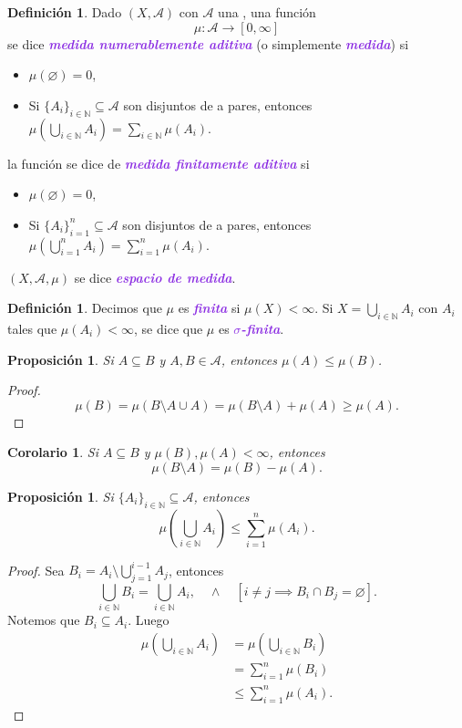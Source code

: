 \documentclass{article}
\newtheorem{corollary}[theorem]{Corolario}
\newtheorem{proposition}[theorem]{Proposición}
\theoremstyle{definition}
\newtheorem{definition}[theorem]{Definición}
\theoremstyle{remark}
\numberwithin{equation}{section}
\newcommand{\A}{\mathcal{A}}
\newcommand{\N}{\mathbb{N}}
\newcommand{\oo}{\infty}
\newcommand{\br}[1]{\left( #1 \right)}
\newcommand{\cor}[1]{\left[ #1 \right]}
\newcommand{\wea}[1]{\textcolor{BlueViolet}{\textbf{\emph{#1}}}}
\newcommand{\sialg}{\text{$\sigma$-álgebra}}
\begin{document}
\begin{definition}
  Dado $(X,\A)$ con $\A$ una \sialg, una función $$\mu \colon \A \to [0,\oo]$$ se dice \wea{medida numerablemente aditiva} (o simplemente \wea{medida}) si
  \begin{itemize}
    \item $\mu(\varnothing) = 0$,
    \item Si $\{A_i\}_{i\in\N} \subseteq \A$ son disjuntos de a pares, entonces $\mu\br{\bigcup_{i\in\N} A_i} = \sum_{i\in\N} \mu(A_i)$.
  \end{itemize}
  la función se dice de \wea{medida finitamente aditiva} si
  \begin{itemize}
    \item $\mu(\varnothing) = 0$,
    \item Si $\{A_i\}_{i=1}^n \subseteq \A$ son disjuntos de a pares, entonces $\mu\br{\bigcup_{i=1}^n A_i} = \sum_{i=1}^n \mu(A_i)$.
  \end{itemize}
  $(X,\A,\mu)$ se dice \wea{espacio de medida}.
\end{definition}

\begin{definition}
  Decimos que $\mu$ es \wea{finita} si $\mu(X) < \oo$.
  Si $X = \bigcup_{i\in\N} A_i$ con $A_i$ tales que $\mu(A_i)<\oo$, se dice que $\mu$ es \wea{$\sigma$-finita}.
\end{definition}

\begin{proposition}
  Si $A \subseteq B$ y $A,B \in \A$, entonces $\mu(A) \leq \mu(B)$.
\end{proposition}
\begin{proof}
  \[\mu(B) = \mu(B \setminus A \cup A) = \mu(B \setminus A) + \mu(A) \geq \mu(A).\]
\end{proof}

\begin{corollary}
  Si $A \subseteq B$ y $\mu(B),\mu(A) < \oo$, entonces
  \[\mu(B \setminus A) = \mu(B) - \mu(A).\]
\end{corollary}

\begin{proposition}
  Si $\{A_i\}_{i\in\N} \subseteq \A$, entonces
  \[\mu\br{\bigcup_{i\in\N} A_i} \leq \sum_{i=1}^n \mu(A_i).\]
\end{proposition}
\begin{proof}
  Sea $B_i = A_i \setminus \bigcup_{j=1}^{i-1} A_j$, entonces
  \[\bigcup_{i\in\N} B_i = \bigcup_{i\in\N} A_i, \quad\land\quad \cor{i\neq j \implies B_i \cap B_j = \varnothing}.\]
  Notemos que $B_i \subseteq A_i$. Luego
  \begin{align*}
    \mu\br{\bigcup_{i\in\N} A_i}
    &= \mu\br{\bigcup_{i\in\N} B_i} \\
    &= \sum_{i=1}^n \mu(B_i) \\
    &\leq \sum_{i=1}^n \mu(A_i).
  \end{align*}
\end{proof}
\end{document}
